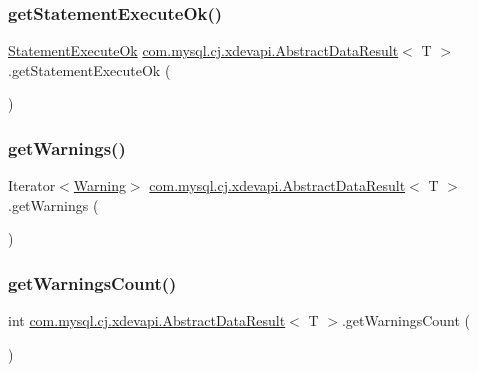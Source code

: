 \subsubsection{\texorpdfstring{get\+Statement\+Execute\+Ok()}{getStatementExecuteOk()}}
{\footnotesize\ttfamily \mbox{\hyperlink{classcom_1_1mysql_1_1cj_1_1protocol_1_1x_1_1_statement_execute_ok}{Statement\+Execute\+Ok}} \mbox{\hyperlink{classcom_1_1mysql_1_1cj_1_1xdevapi_1_1_abstract_data_result}{com.\+mysql.\+cj.\+xdevapi.\+Abstract\+Data\+Result}}$<$ T $>$.get\+Statement\+Execute\+Ok (\begin{DoxyParamCaption}{ }\end{DoxyParamCaption})}

\mbox{\label{classcom_1_1mysql_1_1cj_1_1xdevapi_1_1_abstract_data_result_ac75c20b55a1923cac43c52ca6df9bdca}} 
\subsubsection{\texorpdfstring{get\+Warnings()}{getWarnings()}}
{\footnotesize\ttfamily Iterator$<$\mbox{\hyperlink{interfacecom_1_1mysql_1_1cj_1_1protocol_1_1_warning}{Warning}}$>$ \mbox{\hyperlink{classcom_1_1mysql_1_1cj_1_1xdevapi_1_1_abstract_data_result}{com.\+mysql.\+cj.\+xdevapi.\+Abstract\+Data\+Result}}$<$ T $>$.get\+Warnings (\begin{DoxyParamCaption}{ }\end{DoxyParamCaption})}

\mbox{\label{classcom_1_1mysql_1_1cj_1_1xdevapi_1_1_abstract_data_result_aa3c13a06303670b7e9720befa3daf72b}} 
\subsubsection{\texorpdfstring{get\+Warnings\+Count()}{getWarningsCount()}}
{\footnotesize\ttfamily int \mbox{\hyperlink{classcom_1_1mysql_1_1cj_1_1xdevapi_1_1_abstract_data_result}{com.\+mysql.\+cj.\+xdevapi.\+Abstract\+Data\+Result}}$<$ T $>$.get\+Warnings\+Count (\begin{DoxyParamCaption}{ }\end{DoxyParamCaption})}

